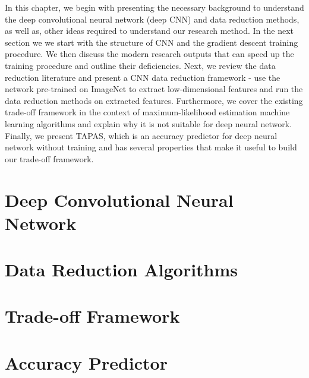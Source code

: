 In this chapter, we begin with presenting the necessary background to understand the deep convolutional neural network (deep CNN) and data reduction methods, as well as, other ideas required to understand our research method.  In the next section we we start with the structure of CNN and the gradient descent training procedure. We then discuss the modern research outputs that can speed up the training procedure and outline their deficiencies. Next, we review the data reduction literature and present a CNN data reduction framework - use the network pre-trained on ImageNet to extract low-dimensional features and run the data reduction methods on extracted features. Furthermore, we cover the existing trade-off framework in the context of maximum-likelihood estimation machine learning algorithms and explain why it is not suitable for deep neural network. Finally, we present TAPAS, which is an accuracy predictor for deep neural network without training and has several properties that make it useful to build our trade-off framework.

\section{Deep Convolutional Neural Network}

\section{Data Reduction Algorithms}

\section{Trade-off Framework}

\section{Accuracy Predictor}